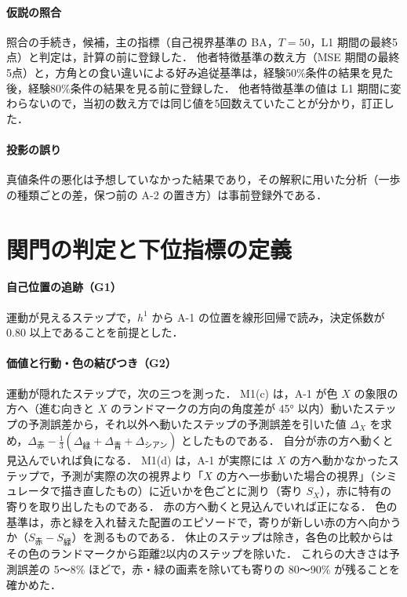 \paragraph{仮説の照合}
照合の手続き，候補，主の指標（自己視界基準の BA，$T=50$，L1 期間の最終5点）と判定は，計算の前に登録した．
他者特徴基準の数え方（MSE 期間の最終5点）と，方角との食い違いによる好み追従基準は，経験50\%条件の結果を見た後，経験80\%条件の結果を見る前に登録した．
他者特徴基準の値は L1 期間に変わらないので，当初の数え方では同じ値を5回数えていたことが分かり，訂正した．

\paragraph{投影の誤り}
真値条件の悪化は予想していなかった結果であり，その解釈に用いた分析（一歩の種類ごとの差，保つ前の A-2 の置き方）は事前登録外である．

\section{関門の判定と下位指標の定義}\label{app:gates}

\paragraph{自己位置の追跡（G1）}
運動が見えるステップで，$h^1$ から A-1 の位置を線形回帰で読み，決定係数が 0.80 以上であることを前提とした．

\paragraph{価値と行動・色の結びつき（G2）}
運動が隠れたステップで，次の三つを測った．
M1(c) は，A-1 が色 $X$ の象限の方へ（進む向きと $X$ のランドマークの方向の角度差が 45° 以内）動いたステップの予測誤差から，それ以外へ動いたステップの予測誤差を引いた値 $\Delta_X$ を求め，$\Delta_{\text{赤}}-\frac13(\Delta_{\text{緑}}+\Delta_{\text{青}}+\Delta_{\text{シアン}})$ としたものである．
自分が赤の方へ動くと見込んでいれば負になる．
M1(d) は，A-1 が実際には $X$ の方へ動かなかったステップで，予測が実際の次の視界より「$X$ の方へ一歩動いた場合の視界」（シミュレータで描き直したもの）に近いかを色ごとに測り（寄り $S_X$），赤に特有の寄りを取り出したものである．
赤の方へ動くと見込んでいれば正になる．
色の基準は，赤と緑を入れ替えた配置のエピソードで，寄りが新しい赤の方へ向かうか（$S_{\text{赤}}-S_{\text{緑}}$）を測るものである．
休止のステップは除き，各色の比較からはその色のランドマークから距離2以内のステップを除いた．
これらの大きさは予測誤差の 5〜8\% ほどで，赤・緑の画素を除いても寄りの 80〜90\% が残ることを確かめた．

